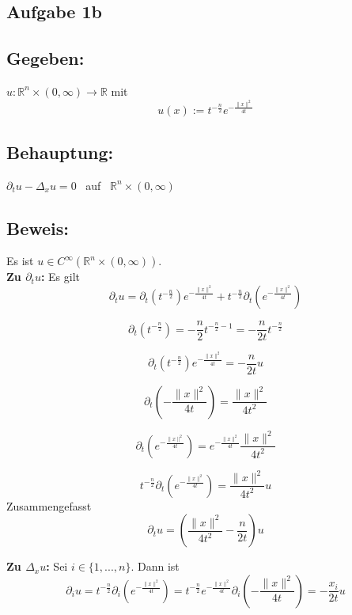 \documentclass[a4paper, 12pt]{article} %
\begin{document}
\begin{flushleft}
        \section*{Aufgabe 1b}

        \subsection*{Gegeben:}
        $u:\mathbb{R}^n \times (0,\infty)\rightarrow \mathbb{R}$ mit
        $$
        u(x) := t^{-\frac{n}{2}} e^{-\frac{\|x\|^2}{4t}}
        $$

        \subsection*{Behauptung:}
        $\partial_t u - \Delta_x u = 0$ \, auf \, $\mathbb{R}^n \times (0,\infty)$

        \subsection*{Beweis:}
        Es ist $u \in C^\infty(\mathbb{R}^n\times (0,\infty))$.\\
        \textbf{Zu $\partial_t u$:} Es gilt
        $$
        \partial_t u = \partial_t \left (t^{-\frac{n}{2}} \right ) e^{-\frac{\|x\|^2}{4t}}
                     + t^{-\frac{n}{2}} \partial_t \left ( e^{-\frac{\|x\|^2}{4t}} \right )
        $$

        $$
        \partial_t \left (t^{-\frac{n}{2}} \right ) = -\frac{n}{2} t^{-\frac{n}{2}-1} 
                                                    = -\frac{n}{2t} t^{-\frac{n}{2}}
        $$

        $$
        \partial_t \left (t^{-\frac{n}{2}} \right ) e^{-\frac{\|x\|^2}{4t}} 
            = -\frac{n}{2t}u
        $$

        $$
        \partial_t \left (-\frac{\|x\|^2}{4t} \right ) = \frac{\|x\|^2}{4t^2}
        $$

        $$
        \partial_t \left (e^{-\frac{\|x\|^2}{4t}} \right ) 
            = e^{-\frac{\|x\|^2}{4t}} \frac{\|x\|^2}{4t^2}
        $$

        $$
        t^{-\frac{n}{2}} \partial_t \left ( e^{-\frac{\|x\|^2}{4t}} \right )
                = \frac{\|x\|^2}{4t^2} u
        $$
        Zusammengefasst
        $$
        \partial_t u = \left ( \frac{\|x\|^2}{4t^2} - \frac{n}{2t} \right ) u
        $$

        \textbf{Zu $\Delta_x u$:} Sei $i \in \{1,...,n\}$. Dann ist
        $$
        \partial_i u = t^{-\frac{n}{2}} \partial_i \left (e^{-\frac{\|x\|^2}{4t}} \right )
                     = t^{-\frac{n}{2}} e^{-\frac{\|x\|^2}{4t}} \partial_i \left (-\frac{\|x\|^2}{4t} \right )
                     = - \frac{x_i}{2t} u
        $$
        

\end{flushleft}
\end{document}
